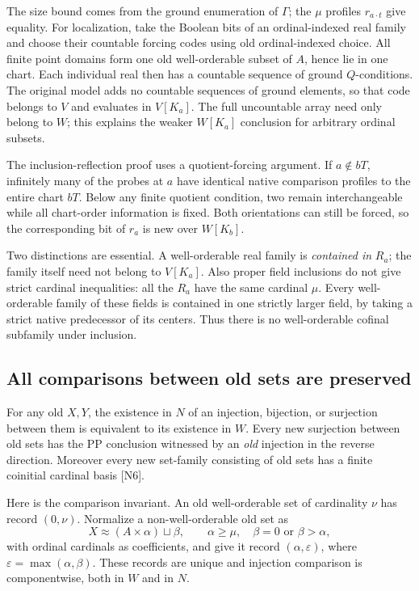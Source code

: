 The size bound comes from the ground enumeration of $\Gamma$; the
$\mu$ profiles $r_{a\cdot t}$ give equality.  For localization, take
the Boolean bits of an ordinal-indexed real family and choose their
countable forcing codes using old ordinal-indexed choice.  All finite
point domains form one old well-orderable subset of $A$, hence lie
in one chart.  Each individual real then has a countable sequence of
ground $Q$-conditions.  The original model adds no countable sequences
of ground elements, so that code belongs to $V$ and evaluates in
$V[K_a]$.  The full uncountable array need only belong to $W$; this
explains the weaker $W[K_a]$ conclusion for arbitrary ordinal subsets.

The inclusion-reflection proof uses a quotient-forcing argument.  If
$a\notin bT$, infinitely many of the probes at $a$ have identical
native comparison profiles to the entire chart $bT$.  Below any finite
quotient condition, two remain interchangeable while all chart-order
information is fixed.  Both orientations can still be forced, so the
corresponding bit of $r_a$ is new over $W[K_b]$.

Two distinctions are essential.  A well-orderable real family is
\emph{contained in} $R_a$; the family itself need not belong to
$V[K_a]$.  Also proper field inclusions do not give strict cardinal
inequalities: all the $R_a$ have the same cardinal $\mu$.  Every
well-orderable family of these fields is contained in one strictly
larger field, by taking a strict native predecessor of its centers.
Thus there is no well-orderable cofinal subfamily under inclusion.

\subsection{All comparisons between old sets are preserved}

For any old $X,Y$, the existence in $N$ of an injection, bijection, or
surjection between them is equivalent to its existence in $W$.
Every new surjection between old sets has the PP conclusion witnessed
by an \emph{old} injection in the reverse direction.  Moreover every
new set-family consisting of old sets has a finite coinitial cardinal
basis [N6].

Here is the comparison invariant.  An old well-orderable set of
cardinality $\nu$ has record $(0,\nu)$.  Normalize a non-well-orderable
old set as
\[
 X\approx(A\times\alpha)\sqcup\beta,\qquad
 \alpha\geq\mu,\quad \beta=0\text{ or }\beta>\alpha,
\]
with ordinal cardinals as coefficients, and give it record
$(\alpha,\varepsilon)$, where $\varepsilon=\max(\alpha,\beta)$.
These records are unique and injection comparison is componentwise,
both in $W$ and in $N$.


